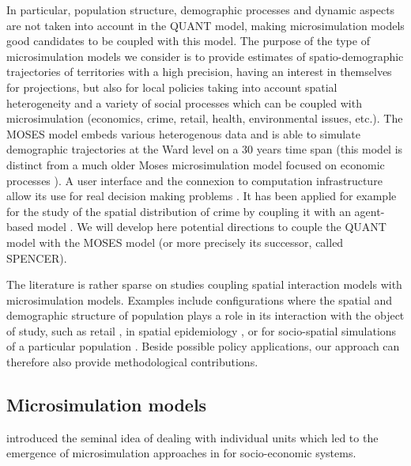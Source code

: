 \documentclass[11pt]{article}
\begin{document}
In particular, population structure, demographic processes and dynamic aspects are not taken into account in the QUANT model, making microsimulation models \cite{birkin2011spatial} good candidates to be coupled with this model. The purpose of the type of microsimulation models we consider is to provide estimates of spatio-demographic trajectories of territories with a high precision, having an interest in themselves for projections, but also for local policies taking into account spatial heterogeneity and a variety of social processes which can be coupled with microsimulation (economics, crime, retail, health, environmental issues, etc.). The MOSES model embeds various heterogenous data and is able to simulate demographic trajectories at the Ward level on a 30 years time span \cite{townend2009moses,Wu2013} (this model is distinct from a much older Moses microsimulation model focused on economic processes \cite{eliasson1989moses}). A user interface and the connexion to computation infrastructure allow its use for real decision making problems \cite{birkin2009moses}. It has been applied for example for the study of the spatial distribution of crime by coupling it with an agent-based model \cite{malleson2012analysis}. We will develop here potential directions to couple the QUANT model with the MOSES model (or more precisely its successor, called SPENCER).

The literature is rather sparse on studies coupling spatial interaction models with microsimulation models. Examples include configurations where the spatial and demographic structure of population plays a role in its interaction with the object of study, such as retail \cite{Nakaya2007}, in spatial epidemiology \cite{morrissey2010examining}, or for socio-spatial simulations of a particular population \cite{wu2008spatial}. Beside possible policy applications, our approach can therefore also provide methodological contributions.


\subsection{Microsimulation models}

\cite{orcutt1957new} introduced the seminal idea of dealing with individual units which led to the emergence of microsimulation approaches in for socio-economic systems.
\end{document}
